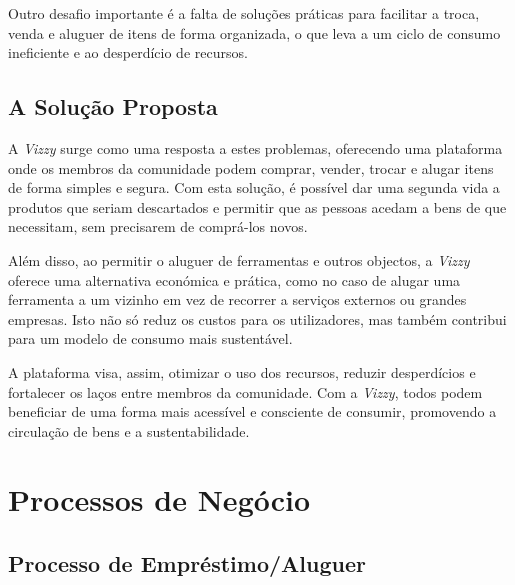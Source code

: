 \documentclass[a4paper, 12pt]{article} %
\begin{document}
Outro desafio importante é a falta de soluções práticas para facilitar a troca, venda e aluguer de itens de forma organizada, o que leva a um ciclo de consumo ineficiente e ao desperdício de recursos.

\subsection{A Solução Proposta}

A \textit{Vizzy} surge como uma resposta a estes problemas, oferecendo uma plataforma onde os membros da comunidade podem comprar, vender, trocar e alugar itens de forma simples e segura. Com esta solução, é possível dar uma segunda vida a produtos que seriam descartados e permitir que as pessoas acedam a bens de que necessitam, sem precisarem de comprá-los novos.

Além disso, ao permitir o aluguer de ferramentas e outros objectos, a \textit{Vizzy} oferece uma alternativa económica e prática, como no caso de alugar uma ferramenta a um vizinho em vez de recorrer a serviços externos ou grandes empresas. Isto não só reduz os custos para os utilizadores, mas também contribui para um modelo de consumo mais sustentável.

A plataforma visa, assim, otimizar o uso dos recursos, reduzir desperdícios e fortalecer os laços entre membros da comunidade. Com a \textit{Vizzy}, todos podem beneficiar de uma forma mais acessível e consciente de consumir, promovendo a circulação de bens e a sustentabilidade.


\newpage
\section{Processos de Negócio}

\subsection{Processo de Empréstimo/Aluguer}
\end{document}

